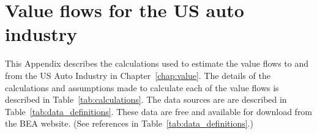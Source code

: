 %
%
%
\chapter{Value flows for the US auto industry}
\label{chap:auto_value_flows} 


This Appendix describes the calculations used 
to estimate the value flows to and from the US Auto Industry  
in Chapter~\ref{chap:value}.  
The details of the calculations and assumptions made to calculate 
each of the value flows is described in Table~\ref{tab:calculations}. 
The data sources are are described in Table~\ref{tab:data_definitions}. 
These data are free and available for download 
from the BEA website.
(See references in Table~\ref{tab:data_definitions}.)

